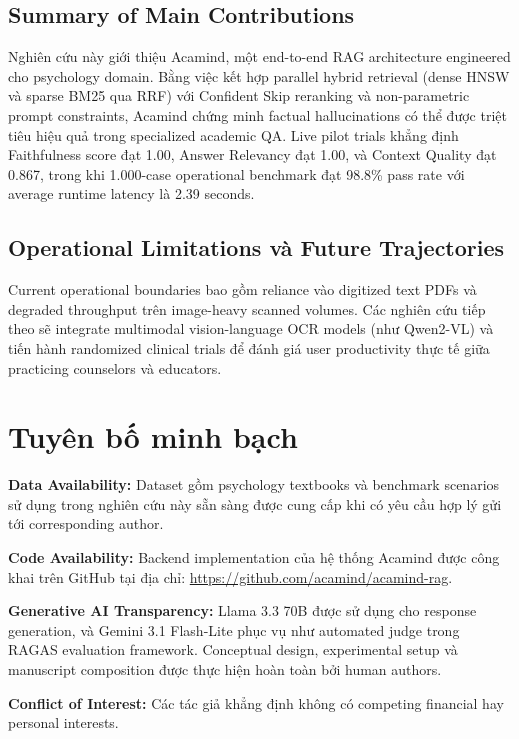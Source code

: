 \documentclass[10pt]{SPIIRAS_Proceedings}
\begin{document}
\subsection{Summary of Main Contributions}
Nghiên cứu này giới thiệu Acamind, một end-to-end RAG architecture engineered cho psychology domain. Bằng việc kết hợp parallel hybrid retrieval (dense HNSW và sparse BM25 qua RRF) với Confident Skip reranking và non-parametric prompt constraints, Acamind chứng minh factual hallucinations có thể được triệt tiêu hiệu quả trong specialized academic QA. Live pilot trials khẳng định Faithfulness score đạt 1.00, Answer Relevancy đạt 1.00, và Context Quality đạt 0.867, trong khi 1.000-case operational benchmark đạt 98.8\% pass rate với average runtime latency là 2.39 seconds.

\subsection{Operational Limitations và Future Trajectories}
Current operational boundaries bao gồm reliance vào digitized text PDFs và degraded throughput trên image-heavy scanned volumes. Các nghiên cứu tiếp theo sẽ integrate multimodal vision-language OCR models (như Qwen2-VL) và tiến hành randomized clinical trials để đánh giá user productivity thực tế giữa practicing counselors và educators.

\section*{Tuyên bố minh bạch}
\leavevmode\par\smallskip
\noindent\textbf{Data Availability:} Dataset gồm psychology textbooks và benchmark scenarios sử dụng trong nghiên cứu này sẵn sàng được cung cấp khi có yêu cầu hợp lý gửi tới corresponding author.\par\smallskip
\noindent\textbf{Code Availability:} Backend implementation của hệ thống Acamind được công khai trên GitHub tại địa chỉ: \url{https://github.com/acamind/acamind-rag}.\par\smallskip
\noindent\textbf{Generative AI Transparency:} Llama 3.3 70B được sử dụng cho response generation, và Gemini 3.1 Flash-Lite phục vụ như automated judge trong RAGAS evaluation framework. Conceptual design, experimental setup và manuscript composition được thực hiện hoàn toàn bởi human authors.\par\smallskip
\noindent\textbf{Conflict of Interest:} Các tác giả khẳng định không có competing financial hay personal interests.
\end{document}
